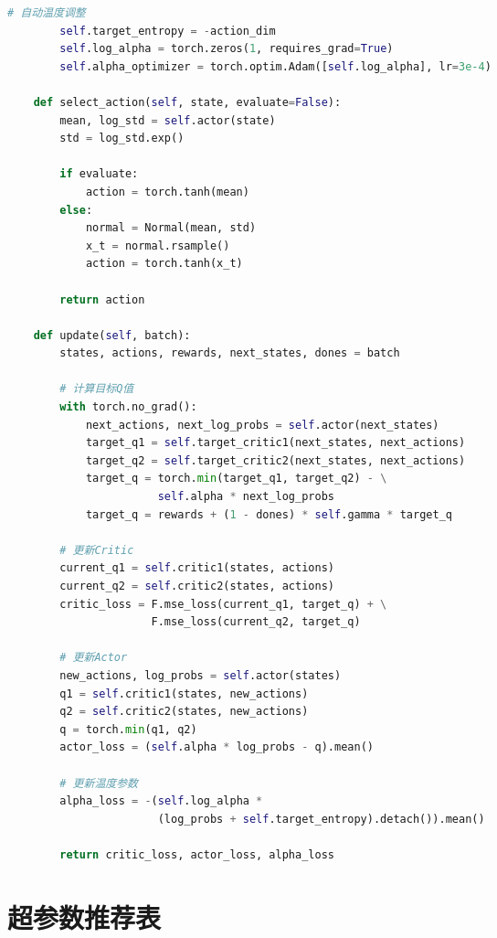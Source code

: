 \documentclass[12pt,a4paper]{ctexart}
\begin{document}
\begin{thebibliography}{99}
\begin{lstlisting}[language=python, caption=SAC核心实现]
        # 自动温度调整
        self.target_entropy = -action_dim
        self.log_alpha = torch.zeros(1, requires_grad=True)
        self.alpha_optimizer = torch.optim.Adam([self.log_alpha], lr=3e-4)
    
    def select_action(self, state, evaluate=False):
        mean, log_std = self.actor(state)
        std = log_std.exp()
        
        if evaluate:
            action = torch.tanh(mean)
        else:
            normal = Normal(mean, std)
            x_t = normal.rsample()
            action = torch.tanh(x_t)
        
        return action
    
    def update(self, batch):
        states, actions, rewards, next_states, dones = batch
        
        # 计算目标Q值
        with torch.no_grad():
            next_actions, next_log_probs = self.actor(next_states)
            target_q1 = self.target_critic1(next_states, next_actions)
            target_q2 = self.target_critic2(next_states, next_actions)
            target_q = torch.min(target_q1, target_q2) - \
                       self.alpha * next_log_probs
            target_q = rewards + (1 - dones) * self.gamma * target_q
        
        # 更新Critic
        current_q1 = self.critic1(states, actions)
        current_q2 = self.critic2(states, actions)
        critic_loss = F.mse_loss(current_q1, target_q) + \
                      F.mse_loss(current_q2, target_q)
        
        # 更新Actor
        new_actions, log_probs = self.actor(states)
        q1 = self.critic1(states, new_actions)
        q2 = self.critic2(states, new_actions)
        q = torch.min(q1, q2)
        actor_loss = (self.alpha * log_probs - q).mean()
        
        # 更新温度参数
        alpha_loss = -(self.log_alpha * 
                       (log_probs + self.target_entropy).detach()).mean()
        
        return critic_loss, actor_loss, alpha_loss
\end{lstlisting}

\section{超参数推荐表}\label{app:hyperparams}


\end{thebibliography}
\end{document}
